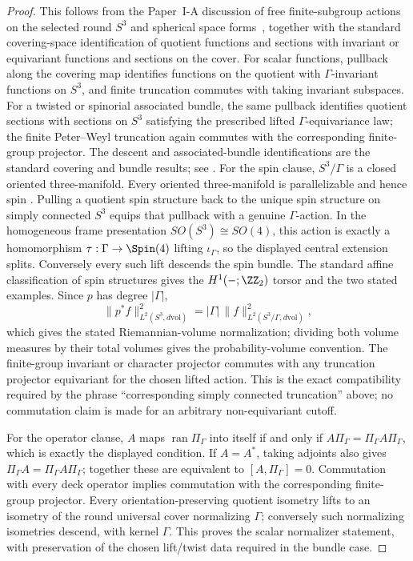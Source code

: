 \documentclass[11pt,a4paper]{article}
\begin{document}
\begin{proof}
This follows from the Paper~I-A discussion of free finite-subgroup actions on the selected round \(S^3\) and spherical space forms~\cite{Kugelmann2026a}, together with the standard covering-space identification of quotient functions and sections with invariant or equivariant functions and sections on the cover.  For scalar functions, pullback along the covering map identifies functions on the quotient with \(\Gamma\)-invariant functions on \(S^3\), and finite truncation commutes with taking invariant subspaces.  For a twisted or spinorial associated bundle, the same pullback identifies quotient sections with sections on \(S^3\) satisfying the prescribed lifted \(\Gamma\)-equivariance law; the finite Peter--Weyl truncation again commutes with the corresponding finite-group projector.
The descent and associated-bundle identifications are the standard covering
and bundle results; see \cite{hatcher2002algebraic,steenrod1951topology}.
For the spin clause, \(S^3/\Gamma\) is a closed oriented three-manifold.
Every oriented three-manifold is parallelizable and hence spin
\cite{lawson1989spin}.  Pulling a quotient spin structure back to the unique
spin structure on simply connected \(S^3\) equips that pullback with a genuine
\(\Gamma\)-action.  In the homogeneous frame presentation
\(SO(S^3)\cong SO(4)\), this action is exactly a homomorphism
\(\tau:\Gamma\to\Spin(4)\) lifting \(\iota_\Gamma\), so the displayed
central extension splits.  Conversely every such lift descends the spin
bundle.  The standard affine classification of spin structures gives the
\(H^1(-;\ZZ_2)\) torsor and the two stated examples.
Since \(p\) has degree \(|\Gamma|\),
\[
 \|p^*f\|_{L^2(S^3,d\mathrm{vol})}^2
 =
 |\Gamma|\,\|f\|_{L^2(S^3/\Gamma,d\mathrm{vol})}^2,
\]
which gives the stated Riemannian-volume normalization; dividing both volume
measures by their total volumes gives the probability-volume convention.
The finite-group invariant or character projector commutes with any truncation
projector equivariant for the chosen lifted action.  This is the exact
compatibility required by the phrase ``corresponding simply connected
truncation'' above; no commutation claim is made for an arbitrary
non-equivariant cutoff.

For the operator clause, \(A\) maps \(\operatorname{ran}\Pi_\Gamma\)
into itself if and only if \(A\Pi_\Gamma=\Pi_\Gamma A\Pi_\Gamma\),
which is exactly the displayed condition.  If \(A=A^*\), taking adjoints
also gives \(\Pi_\Gamma A=\Pi_\Gamma A\Pi_\Gamma\); together these
are equivalent to \([A,\Pi_\Gamma]=0\).  Commutation with every deck
operator implies commutation with the corresponding finite-group projector.
Every orientation-preserving quotient isometry lifts to an isometry of the
round universal cover normalizing \(\Gamma\); conversely such normalizing
isometries descend, with kernel \(\Gamma\).  This proves the scalar
normalizer statement, with preservation of the chosen lift/twist data
required in the bundle case.


\end{proof}
\end{document}
